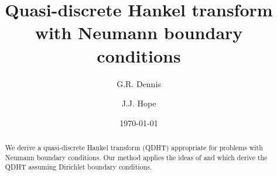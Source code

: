 \documentclass[aip,amsmath,amssymb,reprint,onecolumn]{revtex4-1}
\begin{document}

\title{Quasi-discrete Hankel transform with Neumann boundary conditions} %



\author{G.R. Dennis}

\author{J.J. Hope}


\date{\today}

\begin{abstract}
We derive a quasi-discrete Hankel transform (QDHT) appropriate for problems with Neumann boundary conditions.  Our method applies the ideas of \citet{Yu:1998} and \citet{Guizar-Sicairos:2004} which derive the QDHT assuming Dirichlet boundary conditions.

\end{abstract}

\pacs{}%

\maketitle %

\end{document}
